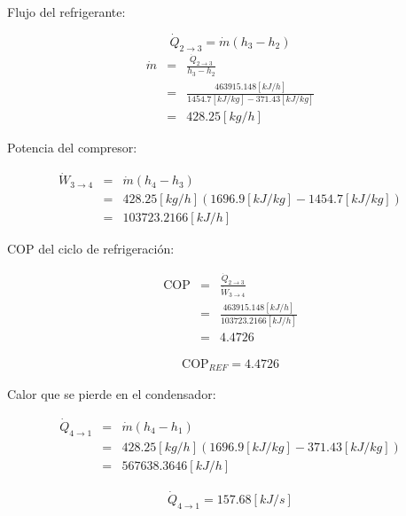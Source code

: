 \documentclass[letter,10pt]{article}
\begin{document}
\begin{enumerate}
Flujo del refrigerante:

\begin{equation*}
    \dot{Q}_{2\rightarrow3} = \dot{m}(h_3 - h_2)
\end{equation*}
\begin{eqnarray*}
    \dot{m} &=& \frac{\dot{Q}_{2\rightarrow3}}{h_3 - h_2} \\
            &=& \frac{463915.148[kJ/h]}{1454.7[kJ/kg]-371.43[kJ/kg]} \\
            &=& 428.25[kg/h]
\end{eqnarray*}

Potencia del compresor:

\begin{eqnarray*}
    \dot{W}_{3\rightarrow4} &=& \dot{m}(h_4 - h_3) \\
                            &=& 428.25[kg/h](1696.9[kJ/kg]-1454.7[kJ/kg]) \\
                            &=& 103723.2166[kJ/h]
\end{eqnarray*}

COP del ciclo de refrigeración:

\begin{eqnarray*}
    \text{COP} &=& \frac{\dot{Q}_{2\rightarrow3}}{\dot{W}_{3\rightarrow4}} \\
               &=& \frac{463915.148[kJ/h]}{103723.2166[kJ/h]} \\
               &=& 4.4726
\end{eqnarray*}

\begin{equation*}
\boxed{
    \begin{array}{l}
        \text{COP}_{REF} = 4.4726
    \end{array}
}
\end{equation*}

Calor que se pierde en el condensador:

\begin{eqnarray*}
    \dot{Q}_{4\rightarrow1} &=& \dot{m}(h_4 - h_1) \\
                            &=& 428.25[kg/h](1696.9[kJ/kg]-371.43[kJ/kg]) \\
                            &=& 567638.3646[kJ/h]
\end{eqnarray*}

\begin{equation*}
\boxed{
    \begin{array}{l}
        \dot{Q}_{4\rightarrow1} = 157.68[kJ/s]
    \end{array}
}
\end{equation*}


\end{enumerate}
\end{document}
